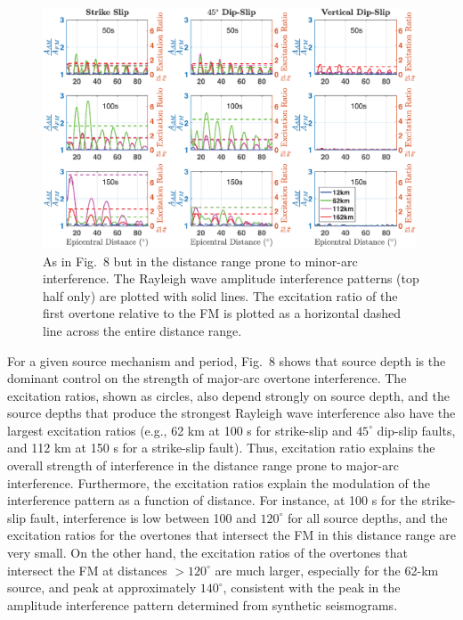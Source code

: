\documentclass[extra,mreferee]{gji}
\begin{document}
         \begin{figure}
 \includegraphics[width=0.99\textwidth]{Fig9.eps}
 \caption{As in Fig.\ 8 but in the distance range prone to minor-arc interference. The Rayleigh wave amplitude interference patterns (top half only) are plotted with solid lines. The excitation ratio of the first overtone relative to the FM is plotted as a horizontal dashed line across the entire distance range. }
     \end{figure}     
     
 For a given source mechanism and period, Fig.\ 8 shows that source depth is the dominant control on the strength of major-arc overtone interference. The excitation ratios, shown as circles, also depend strongly on source depth, and the source depths that produce the strongest Rayleigh wave interference also have the largest excitation ratios (e.g., 62 km at 100 s for strike-slip and $45^\circ$ dip-slip faults, and 112 km at 150 s for a strike-slip fault). Thus, excitation ratio explains the overall strength of interference in the distance range prone to major-arc interference. Furthermore, the excitation ratios explain the modulation of the interference pattern as a function of distance. For instance, at 100 s for the strike-slip fault, interference is low between 100 and $120^\circ$ for all source depths, and the excitation ratios for the overtones that intersect the FM in this distance range are very small. On the other hand, the excitation ratios of the overtones that intersect the FM at distances $> 120^\circ$ are much larger, especially for the 62-km source, and peak at approximately $140^\circ$, consistent with the peak in the amplitude interference pattern determined from synthetic seismograms. 
\end{document}
